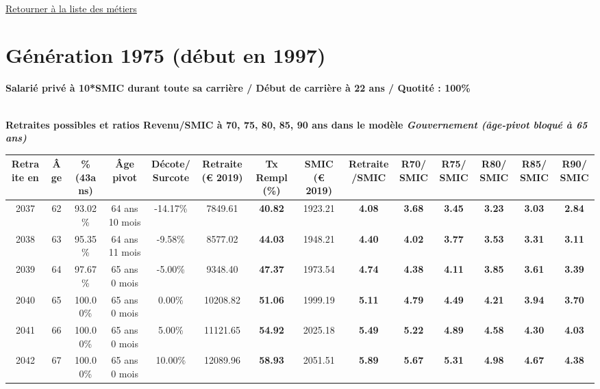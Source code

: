 

   
 \localtableofcontents 

~\\ 
 
 \hyperlink{page.2}{\noindent Retourner à la liste des métiers}

 \newpage 

\section{Génération 1975 (début en 1997)\label{10SMIC_100_22_1975_0}} 
 
{\bf \noindent Salarié privé à 10*SMIC durant toute sa carrière / Début de carrière à 22 ans / Quotité : 100\%}  ~ 

 ~\\{\bf \noindent Retraites possibles et ratios Revenu/SMIC à 70, 75, 80, 85, 90 ans dans le modèle \emph{Gouvernement (âge-pivot bloqué à 65 ans)}}  
 
\begin{adjustbox}{max width=\textwidth} 
\begin{tabular}[htb]{|c|c||c|c|c||c|c||c|c||c|c|c|c|c|} 
\hline 
 Retraite en &  Âge &  \%(43ans) &  Âge pivot &  Décote/Surcote &  Retraite (\euro{} 2019) &  Tx Rempl(\%) &  SMIC (\euro{} 2019) &  Retraite/SMIC &  R70/SMIC &  R75/SMIC &  R80/SMIC &  R85/SMIC &  R90/SMIC \\ 
\hline \hline 
 2037 &  62 &  93.02\% &  64 ans 10 mois &  -14.17\% &  7849.61 &  {\bf 40.82} &  1923.21 &  {\bf 4.08} &  {\bf 3.68} &  {\bf 3.45} &  {\bf 3.23} &  {\bf 3.03} &  {\bf 2.84} \\ 
\hline 
 2038 &  63 &  95.35\% &  64 ans 11 mois &  -9.58\% &  8577.02 &  {\bf 44.03} &  1948.21 &  {\bf 4.40} &  {\bf 4.02} &  {\bf 3.77} &  {\bf 3.53} &  {\bf 3.31} &  {\bf 3.11} \\ 
\hline 
 2039 &  64 &  97.67\% &  65 ans 0 mois &  -5.00\% &  9348.40 &  {\bf 47.37} &  1973.54 &  {\bf 4.74} &  {\bf 4.38} &  {\bf 4.11} &  {\bf 3.85} &  {\bf 3.61} &  {\bf 3.39} \\ 
\hline 
 2040 &  65 &  100.00\% &  65 ans 0 mois &  0.00\% &  10208.82 &  {\bf 51.06} &  1999.19 &  {\bf 5.11} &  {\bf 4.79} &  {\bf 4.49} &  {\bf 4.21} &  {\bf 3.94} &  {\bf 3.70} \\ 
\hline 
 2041 &  66 &  100.00\% &  65 ans 0 mois &  5.00\% &  11121.65 &  {\bf 54.92} &  2025.18 &  {\bf 5.49} &  {\bf 5.22} &  {\bf 4.89} &  {\bf 4.58} &  {\bf 4.30} &  {\bf 4.03} \\ 
\hline 
 2042 &  67 &  100.00\% &  65 ans 0 mois &  10.00\% &  12089.96 &  {\bf 58.93} &  2051.51 &  {\bf 5.89} &  {\bf 5.67} &  {\bf 5.31} &  {\bf 4.98} &  {\bf 4.67} &  {\bf 4.38} \\ 
\hline 
\hline 
\end{tabular} 
\end{adjustbox} 
 
